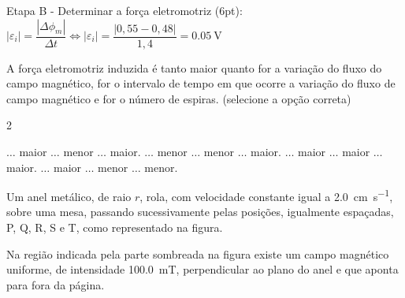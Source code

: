 \documentclass[addpoints]{exam}
\begin{document}
\begin{questions}
\begin{solution}
{				Etapa B - Determinar a força eletromotriz (6pt):\\
				$|\varepsilon_i| = \dfrac{|\Delta \phi_m|}{\Delta t} \Leftrightarrow |\varepsilon_i| = \dfrac{|0,55-0,48|}{1,4} = \SI{0,05}{\volt}$
			}
		\end{solution}
		
		\question[8] A força eletromotriz induzida é tanto maior quanto \underline{\hspace{50pt}} for a variação do fluxo do campo magnético, \underline{\hspace{50pt}} for o intervalo de tempo em que ocorre a variação do fluxo de campo magnético e \underline{\hspace{50pt}} for o número de espiras. (selecione a opção correta)
		
		\begin{multicols}{2}
			\begin{choices}
				\correctchoice $\ldots$ maior $\ldots$ menor $\ldots$ maior.
				\choice $\ldots$ menor $\ldots$ menor $\ldots$ maior.
				\choice $\ldots$ maior $\ldots$ maior $\ldots$ maior.
				\choice $\ldots$ maior $\ldots$ menor $\ldots$ menor.
			\end{choices}
		\end{multicols}

		
		\question Um anel metálico, de raio $r$, rola, com velocidade constante igual a \SI{2,0}{\centi\meter\per\second}, sobre uma mesa, passando sucessivamente pelas posições, igualmente espaçadas, P, Q, R, S e T, como representado na figura.\\
		
		\begin{minipage}{0.4\textwidth}
			Na região indicada pela parte sombreada na figura existe um campo magnético uniforme, de intensidade \SI{100,0}{\milli\tesla}, perpendicular ao plano do anel e que aponta para fora da página.
		\end{minipage}
		\hspace{0.1\textwidth}
		\begin{minipage}{0.4\textwidth}
\end{minipage}
\end{questions}
\end{document}
